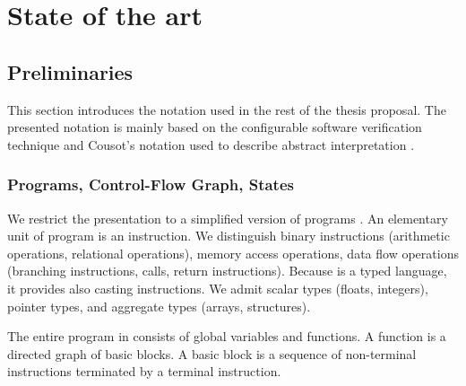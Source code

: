 \chapter{State of the art}
\label{ch:state}



%
%


\section{Preliminaries}

This section introduces the notation used in the rest of the thesis proposal.
The presented notation is mainly based on the configurable software verification technique \cite{Beyer2007, Beyer2018, Beyer2018b} and Cousot's notation used to describe abstract interpretation \cite{Cousot2012}.

\subsection{Programs, Control-Flow Graph, States}
We restrict the presentation to a simplified version of \llvm programs \cite{Lattner04}. An elementary unit of \llvm program is an instruction. We distinguish binary instructions (arithmetic operations, relational operations), memory access operations, data flow operations (branching instructions, calls, return instructions). Because \llvmir is a typed language, it provides also casting instructions. We admit scalar types (floats, integers), pointer types, and aggregate types (arrays, structures).

The entire program in \llvm consists of global variables and functions.
A function is a directed graph of basic blocks. A basic block is a sequence of non-terminal instructions terminated by a terminal instruction.

